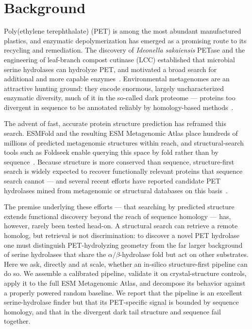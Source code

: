 \documentclass[10pt]{article}
\begin{document}
\section{Background}
Poly(ethylene terephthalate) (PET) is among the most abundant manufactured plastics, and enzymatic depolymerization has emerged as a promising route to its recycling and remediation. The discovery of \emph{Ideonella sakaiensis} PETase and the engineering of leaf-branch compost cutinase (LCC) established that microbial serine hydrolases can hydrolyze PET, and motivated a broad search for additional and more capable enzymes~\cite{yoshida2016,tournier2020}. Environmental metagenomes are an attractive hunting ground: they encode enormous, largely uncharacterized enzymatic diversity, much of it in the so-called dark proteome --- proteins too divergent in sequence to be annotated reliably by homology-based methods~\cite{perdigao2015}.

The advent of fast, accurate protein structure prediction has reframed this search. ESMFold and the resulting ESM Metagenomic Atlas place hundreds of millions of predicted metagenomic structures within reach, and structural-search tools such as Foldseek enable querying this space by fold rather than by sequence~\cite{lin2023,vankempen2024}. Because structure is more conserved than sequence, structure-first search is widely expected to recover functionally relevant proteins that sequence search cannot --- and several recent efforts have reported candidate PET hydrolases mined from metagenomic or structural databases on this basis~\cite{nortonbaker2025,almeida2019}.

The premise underlying these efforts --- that searching by predicted structure extends functional discovery beyond the reach of sequence homology --- has, however, rarely been tested head-on. A structural search can retrieve a remote homolog, but retrieval is not discrimination: to discover a novel PET hydrolase one must distinguish PET-hydrolyzing geometry from the far larger background of serine hydrolases that share the $\alpha/\beta$-hydrolase fold but act on other substrates. Here we ask, directly and at scale, whether an in-silico structure-first pipeline can do so. We assemble a calibrated pipeline, validate it on crystal-structure controls, apply it to the full ESM Metagenomic Atlas, and decompose its behavior against a properly powered random baseline. We report that the pipeline is an excellent serine-hydrolase finder but that its PET-specific signal is bounded by sequence homology, and that in the divergent dark tail structure and sequence fail together.
\end{document}
